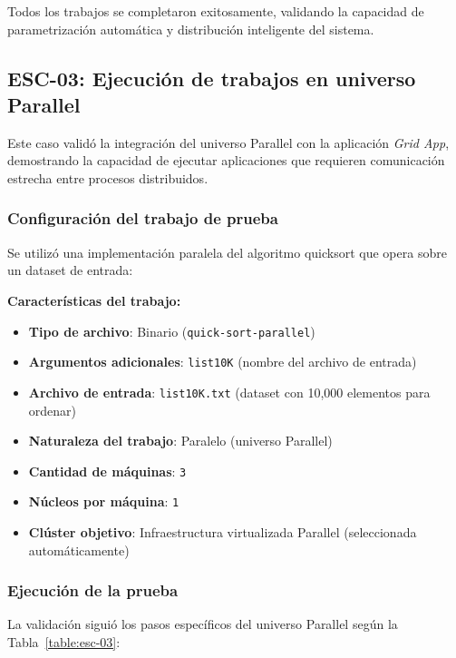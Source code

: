 Todos los trabajos se completaron exitosamente, validando la capacidad de parametrización automática y distribución inteligente del sistema.

\subsection{ESC-03: Ejecución de trabajos en universo Parallel}
\noindent

Este caso validó la integración del universo Parallel con la aplicación \textit{Grid App}, demostrando la capacidad de ejecutar aplicaciones \MPI que requieren comunicación estrecha entre procesos distribuidos.

\subsubsection{Configuración del trabajo de prueba}
\noindent

Se utilizó una implementación paralela del algoritmo quicksort que opera sobre un dataset de entrada:

\textbf{Características del trabajo:}
\begin{itemize}
	\item \textbf{Tipo de archivo}: Binario \MPI (\texttt{quick-sort-parallel})
	\item \textbf{Argumentos adicionales}: \texttt{list10K} (nombre del archivo de entrada)
	\item \textbf{Archivo de entrada}: \texttt{list10K.txt} (dataset con 10,000 elementos para ordenar)
	\item \textbf{Naturaleza del trabajo}: Paralelo (universo Parallel)
	\item \textbf{Cantidad de máquinas}: \texttt{3}
	\item \textbf{Núcleos por máquina}: \texttt{1}
	\item \textbf{Clúster objetivo}: Infraestructura virtualizada Parallel (seleccionada automáticamente)
\end{itemize}

\subsubsection{Ejecución de la prueba}
\noindent

La validación siguió los pasos específicos del universo Parallel según la Tabla~\ref{table:esc-03}:

